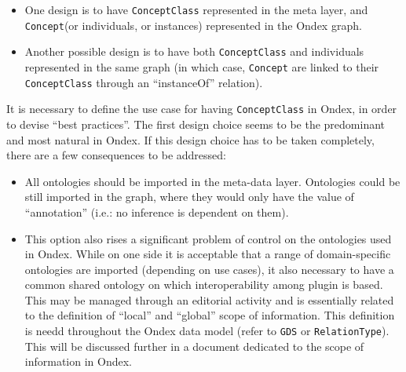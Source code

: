 \documentclass[a4paper,10pt]{article}
\newcommand{\term}[1]{\texttt{#1}\xspace}
\newcommand{\cc}{\term{ConceptClass}}
\newcommand{\co}{\term{Concept}}
\begin{document}
\begin{itemize}
\begin{itemize}
\item One design is to have \cc represented in the meta layer, and \co (or individuals, or instances) represented in the Ondex graph.

\item Another possible design is to have both \cc and individuals represented in the same graph (in which case, \co are linked to their \cc through an ``instanceOf'' relation). 
\end{itemize}

It is necessary to define the use case for having \cc in Ondex, in order to devise ``best practices''.
The first design choice seems to be the predominant and most natural in Ondex.
If this design choice has to be taken completely, there are a few consequences to be addressed:
\begin{itemize}
\item All ontologies should be imported in the meta-data layer. 
Ontologies could be still imported in the graph, where they would only have the value of ``annotation'' (i.e.: no inference is dependent on them). 
\item This option also rises a significant problem of control on the ontologies used in Ondex. While on one side it is acceptable that a range of domain-specific ontologies are imported (depending on use cases), it also necessary to have a common shared ontology on which interoperability among plugin is based. This may be managed through an editorial activity and is essentially related to the definition of ``local'' and ``global'' scope of information. This definition is needd throughout the Ondex data model (refer to \term{GDS} or \term{RelationType}).  This will be discussed further in a document dedicated to the scope of information in Ondex.



\end{itemize}
\end{itemize}
\end{document}

